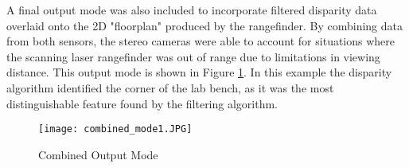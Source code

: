 \par
A final output mode was also included to incorporate filtered disparity data overlaid onto the 2D "floorplan" produced by the rangefinder. By combining data from both sensors, the stereo cameras were able to account for situations where the scanning laser rangefinder was out of range due to limitations in viewing distance. This output mode is shown in Figure \ref{combinedOut}. In this example the disparity algorithm identified the corner of the lab bench, as it was the most distinguishable feature found by the filtering algorithm. 
\par
\begin{figure}[H]
	\centerline{
	\texttt{[image: combined\_mode1.JPG]}
	}
	\caption{Combined Output Mode}
	\label{combinedOut}
\end{figure}